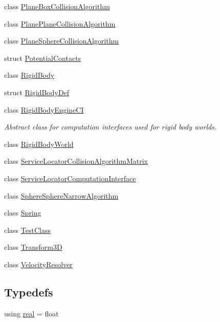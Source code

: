 \begin{DoxyCompactItemize}
\item 
class \mbox{\hyperlink{classr3_1_1_plane_box_collision_algorithm}{Plane\+Box\+Collision\+Algorithm}}
\item 
class \mbox{\hyperlink{classr3_1_1_plane_plane_collision_algorithm}{Plane\+Plane\+Collision\+Algorithm}}
\item 
class \mbox{\hyperlink{classr3_1_1_plane_sphere_collision_algorithm}{Plane\+Sphere\+Collision\+Algorithm}}
\item 
struct \mbox{\hyperlink{structr3_1_1_potential_contacts}{Potential\+Contacts}}
\item 
class \mbox{\hyperlink{classr3_1_1_rigid_body}{Rigid\+Body}}
\item 
struct \mbox{\hyperlink{structr3_1_1_rigid_body_def}{Rigid\+Body\+Def}}
\item 
class \mbox{\hyperlink{classr3_1_1_rigid_body_engine_c_i}{Rigid\+Body\+Engine\+CI}}
\begin{DoxyCompactList}\small\item\em Abstract class for computation interfaces used for rigid body worlds. \end{DoxyCompactList}\item 
class \mbox{\hyperlink{classr3_1_1_rigid_body_world}{Rigid\+Body\+World}}
\item 
class \mbox{\hyperlink{classr3_1_1_service_locator_collision_algorithm_matrix}{Service\+Locator\+Collision\+Algorithm\+Matrix}}
\item 
class \mbox{\hyperlink{classr3_1_1_service_locator_computation_interface}{Service\+Locator\+Computation\+Interface}}
\item 
class \mbox{\hyperlink{classr3_1_1_sphere_sphere_narrow_algorithm}{Sphere\+Sphere\+Narrow\+Algorithm}}
\item 
class \mbox{\hyperlink{classr3_1_1_spring}{Spring}}
\item 
class \mbox{\hyperlink{classr3_1_1_test_class}{Test\+Class}}
\item 
class \mbox{\hyperlink{classr3_1_1_transform3_d}{Transform3D}}
\item 
class \mbox{\hyperlink{classr3_1_1_velocity_resolver}{Velocity\+Resolver}}
\end{DoxyCompactItemize}
\subsection*{Typedefs}
\begin{DoxyCompactItemize}
\item 
using \mbox{\hyperlink{namespacer3_ab2016b3e3f743fb735afce242f0dc1eb}{real}} = float
\end{DoxyCompactItemize}
